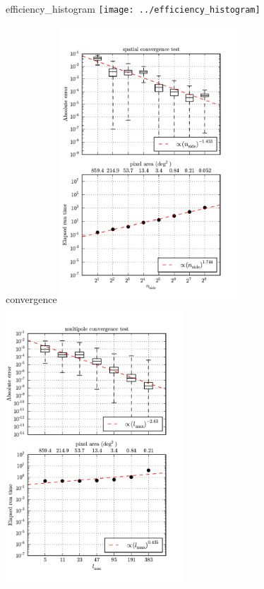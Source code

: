 \documentclass[portrait]{a0poster}
\begin{document}
\begin{staticcontents*}{efficiency_histogram}
\texttt{[image: ../efficiency\_histogram]}
\end{staticcontents*}

\begin{staticcontents*}{convergence}
\includegraphics[width=0.5\textwidth]{spatial}
\includegraphics[width=0.5\textwidth]{multipole}
\end{staticcontents*}
\end{document}
